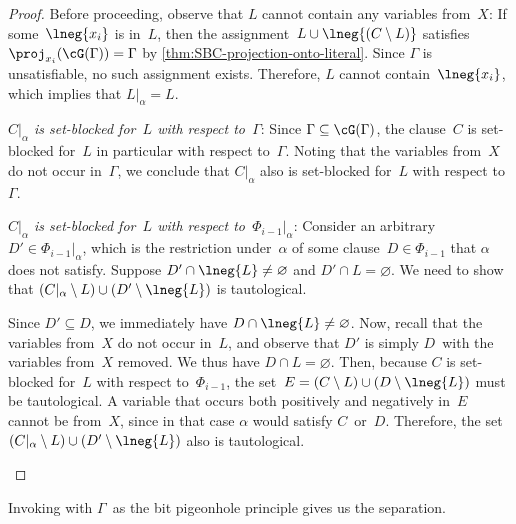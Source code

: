 \documentclass[10pt,a4paper]{article}
\begin{document}
\begin{proof}
  Before proceeding, observe that $L$ cannot contain any variables from~$X$:
  If some~$\lneg{x_i}$ is in~$L$, then the assignment~$L \cup \lneg{(C \setminus L)}$
  satisfies~$\proj_{x_i}(\cG(\Gamma)) = \Gamma$
  by \cref{thm:SBC-projection-onto-literal}.
  Since $\Gamma$ is unsatisfiable, no such assignment exists.
  Therefore, $L$ cannot contain~$\lneg{x_i}$,
  which implies that $L|_\alpha = L$.

  \begin{description}
  \item\hspace{-\labelsep}\ignorespaces
    \textit{$C|_\alpha$ is set-blocked
      for~$L$ with respect to~$\Gamma$}:
    Since $\Gamma \subseteq \cG(\Gamma)$, the clause~$C$
    is set-blocked for~$L$ in particular with respect to~$\Gamma$.
    Noting that the variables from~$X$ do not occur in~$\Gamma$,
    we conclude that $C|_\alpha$ also is set-blocked
    for~$L$ with respect to~$\Gamma$.
  \item\hspace{-\labelsep}\ignorespaces
    \textit{$C|_\alpha$ is set-blocked
      for~$L$ with respect to~$\Phi_{i - 1}|_\alpha$}:
    Consider an arbitrary~$D' \in \Phi_{i - 1}|_\alpha$,
    which is the restriction under~$\alpha$
    of some clause~$D \in \Phi_{i - 1}$ that $\alpha$ does not satisfy.
    Suppose $D' \cap \lneg{L} \neq \varnothing$ and $D' \cap L = \varnothing$.
    We need to show that $(C|_\alpha \setminus L)
    \cup (D' \setminus \lneg{L})$ is tautological.

    Since $D' \subseteq D$, we immediately have $D \cap \lneg{L} \neq \varnothing$.
    Now, recall that the variables from~$X$ do not occur in~$L$,
    and observe that $D'$ is simply $D$~with the variables from~$X$ removed.
    We thus have $D \cap L = \varnothing$.
    Then, because $C$ is set-blocked for~$L$ with respect to~$\Phi_{i - 1}$,
    the set~$E = (C \setminus L) \cup (D \setminus \lneg{L})$ must be tautological.
    A variable that occurs both positively and negatively in~$E$
    cannot be from~$X$, since in that case $\alpha$ would satisfy $C$~or~$D$.
    Therefore, the set~$(C|_\alpha \setminus L)
    \cup (D' \setminus \lneg{L})$ also is tautological. \qedhere
  \end{description}
\end{proof}

Invoking 
with $\Gamma$~as the bit pigeonhole principle gives us the separation.
\end{document}
